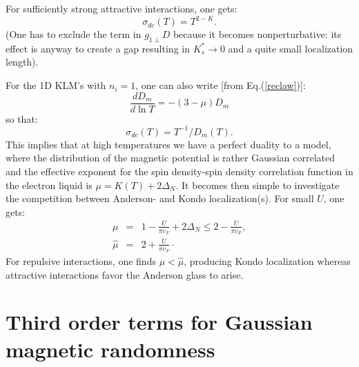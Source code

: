 For sufficiently strong attractive interactions, one gets:
\begin{equation}
\sigma_{dc}(T)=T^{2-K}.
\end{equation}
(One has to exclude the term in $g_{1\perp}D$ because it becomes
 nonperturbative:
its effect is anyway to create a gap resulting in $K_s^*\rightarrow 0$
and a quite small localization length).

For the 1D KLM's with $n_i=1$, one can also write [from
Eq.(\ref{reclaw})]:
\begin{equation}
\frac{dD_m}{d\ln T}=-(3-\mu)D_m
\end{equation}
so that:
\begin{equation}
\sigma_{dc}(T)=T^{-1}/D_m(T).
\end{equation}
This implies that at high temperatures
we have a perfect duality to a model, where the distribution
of the magnetic potential is
rather Gaussian correlated and the effective
exponent for the
spin density-spin density correlation function in
the electron liquid is $\mu=K(T)+2\Delta_N$.
It becomes then simple to investigate the competition between Anderson- and
Kondo localization(s). For small $U$, one gets:
\begin{eqnarray}
\mu &=& 1-\frac{U}{\pi v_F}+2\Delta_N\leq 2-\frac{U}{\pi v_F},\\ \nonumber
\hat{\mu} &=& 2+\frac{U}{\pi v_F}\cdot
\end{eqnarray}
For repulsive interactions, one finds $\mu<\hat{\mu}$, producing Kondo
localization whereas attractive interactions favor the Anderson glass
to arise.

\section{Third order terms for Gaussian magnetic randomness}

